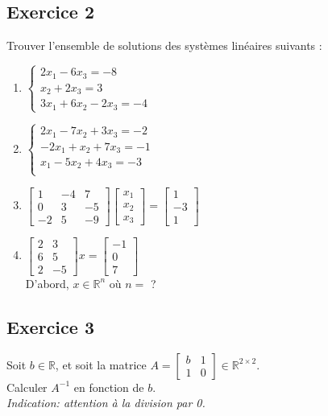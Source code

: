 \documentclass{article}
\newcommand{\R}{\mathbb{R}}
\newcommand{\cross}{\times}
\begin{document}
\subsection*{Exercice 2}
\noindent Trouver l'ensemble de solutions des systèmes linéaires suivants :
\begin{multicols}{2}
\begin{enumerate}
    \item $\begin{cases}
    2x_1 - 6x_3 = -8\\
    x_2 + 2x_3 = 3\\
    3x_1 + 6x_2 -2x_3 = -4
    \end{cases}$
    \item $\begin{cases}
    2x_1 -7x_2+ 3x_3 = -2\\
    -2x_1 + x_2 + 7x_3 = -1\\
    x_1 -5x_2 + 4x_3 = -3\\
    \end{cases}$ 
    \item $\begin{bmatrix}
    1 & -4 & 7\\
    0 & 3 & -5\\
    -2 & 5 & -9
    \end{bmatrix}\begin{bmatrix}
    x_1 \\ x_2 \\ x_3
    \end{bmatrix} =
    \begin{bmatrix}
    1 \\ -3 \\ 1
    \end{bmatrix}$
    \item $\begin{bmatrix}
    2 & 3\\
    6 & 5\\
    2 & -5
    \end{bmatrix}x = 
    \begin{bmatrix}
    -1 \\ 0 \\ 7
    \end{bmatrix}$\\
    
    \noindent D'abord, $x \in \R^n$ où $n = $ ?
\end{enumerate}
\end{multicols}

\subsection*{Exercice 3}
\noindent Soit $b \in \R$, et soit la matrice $A = \begin{bmatrix} b & 1 \\ 1 & 0 \end{bmatrix} \in \R^{2 \cross 2}$. \\
Calculer $A^{-1}$ en fonction de $b$. \\
\textit{Indication: attention à la division par 0.} 
\end{document}
